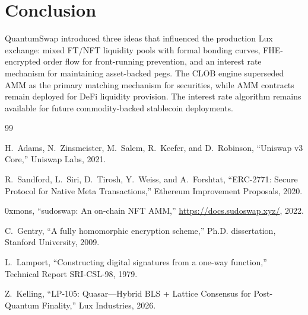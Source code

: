 \section{Conclusion}


QuantumSwap introduced three ideas that influenced the production Lux
exchange: mixed FT/NFT liquidity pools with formal bonding curves,
FHE-encrypted order flow for front-running prevention, and an interest
rate mechanism for maintaining asset-backed pegs. The CLOB engine
superseded AMM as the primary matching mechanism for securities, while
AMM contracts remain deployed for DeFi liquidity provision. The
interest rate algorithm remains available for future commodity-backed
stablecoin deployments.


\begin{thebibliography}{99}

H.~Adams, N.~Zinsmeister, M.~Salem, R.~Keefer, and D.~Robinson,
``Uniswap v3 Core,'' Uniswap Labs, 2021.

R.~Sandford, L.~Siri, D.~Tirosh, Y.~Weiss, and A.~Forshtat, ``ERC-2771: Secure Protocol for Native
Meta Transactions,'' Ethereum Improvement Proposals, 2020.

0xmons, ``sudoswap: An on-chain NFT AMM,''
\url{https://docs.sudoswap.xyz/}, 2022.

C.~Gentry, ``A fully homomorphic encryption scheme,'' Ph.D.
dissertation, Stanford University, 2009.

L.~Lamport, ``Constructing digital signatures from a one-way
function,'' Technical Report SRI-CSL-98, 1979.

Z.~Kelling, ``LP-105: Quasar---Hybrid BLS + Lattice Consensus for
Post-Quantum Finality,'' Lux Industries, 2026.

\end{thebibliography}

